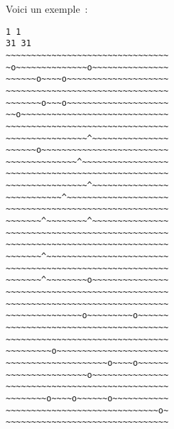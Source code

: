 Voici un exemple~:
\begin{samepage}
\begin{verbatim}1 1
31 31
~~~~~~~~~~~~~~~~~~~~~~~~~~~~~~~~
~o~~~~~~~~~~~~~~o~~~~~~~~~~~~~~~
~~~~~~o~~~~o~~~~~~~~~~~~~~~~~~~~
~~~~~~~~~~~~~~~~~~~~~~~~~~~~~~~~
~~~~~~~o~~~o~~~~~~~~~~~~~~~~~~~~
~~o~~~~~~~~~~~~~~~~~~~~~~~~~~~~~
~~~~~~~~~~~~~~~~~~~~~~~~~~~~~~~~
~~~~~~~~~~~~~~~~^~~~~~~~~~~~~~~~
~~~~~~o~~~~~~~~~~~~~~~~~~~~~~~~~
~~~~~~~~~~~~~~^~~~~~~~~~~~~~~~~~
~~~~~~~~~~~~~~~~~~~~~~~~~~~~~~~~
~~~~~~~~~~~~~~~~^~~~~~~~~~~~~~~~
~~~~~~~~~~~^~~~~~~~~~~~~~~~~~~~~
~~~~~~~~~~~~~~~~~~~~~~~~~~~~~~~~
~~~~~~~^~~~~~~~~^~~~~~~~~~~~~~~~
~~~~~~~~~~~~~~~~~~~~~~~~~~~~~~~~
~~~~~~~~~~~~~~~~~~~~~~~~~~~~~~~~
~~~~~~~^~~~~~~~~~~~~~~~~~~~~~~~~
~~~~~~~~~~~~~~~~~~~~~~~~~~~~~~~~
~~~~~~~^~~~~~~~~o~~~~~~~~~~~~~~~
~~~~~~~~~~~~~~~~~~~~~~~~~~~~~~~~
~~~~~~~~~~~~~~~~~~~~~~~~~~~~~~~~
~~~~~~~~~~~~~~~o~~~~~~~~~o~~~~~~
~~~~~~~~~~~~~~~~~~~~~~~~~~~~~~~~
~~~~~~~~~~~~~~~~~~~~~~~~~~~~~~~~
~~~~~~~~~o~~~~~~~~~~~~~~~~~~~~~~
~~~~~~~~~~~~~~~~~~~~o~~~~o~~~~~~
~~~~~~~~~~~~~~~~o~~~~~~~~~~~~~~~
~~~~~~~~~~~~~~~~~~~~~~~~~~~~~~~~
~~~~~~~~o~~~~o~~~~~~o~~~~~~~~~~~
~~~~~~~~~~~~~~~~~~~~~~~~~~~~~~o~
~~~~~~~~~~~~~~~~~~~~~~~~~~~~~~~~\end{verbatim}
\end{samepage}
